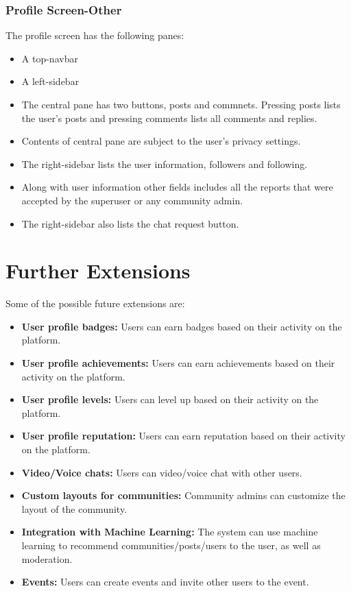 \documentclass[conference,compsoc]{IEEEtran}
\begin{document}
\subsubsection{Profile Screen-Other}
\vspace{0.2cm}
The profile screen has the following panes:
\begin{itemize}
    \item A top-navbar
    \item A left-sidebar
    \item The central pane has two buttons, posts and commnets. Pressing posts lists the user's posts and pressing comments lists all comments and replies.
    \item Contents of central pane are subject to the user's privacy settings.
    \item The right-sidebar lists the user information, followers and following.
    \item Along with user information other fields includes all the reports that were accepted by the superuser or any community admin.
    \item The right-sidebar also lists the chat request button.
\end{itemize}
\section{Further Extensions}
\vspace{0.2cm}
Some of the possible future extensions are:
\begin{itemize}
    \item \textbf{User profile badges:} Users can earn badges based on their activity on the platform.
    \item \textbf{User profile achievements:} Users can earn achievements based on their activity on the platform.
    \item \textbf{User profile levels:} Users can level up based on their activity on the platform.
    \item \textbf{User profile reputation:} Users can earn reputation based on their activity on the platform.
    \item \textbf{Video/Voice chats:} Users can video/voice chat with other users.
    \item \textbf{Custom layouts for communities:} Community admins can customize the layout of the community.
    \item \textbf{Integration with Machine Learning:} The system can use machine learning to recommend communities/posts/users to the user, as well as moderation.
    \item \textbf{Events:} Users can create events and invite other users to the event.
\end{itemize}
\end{document}
